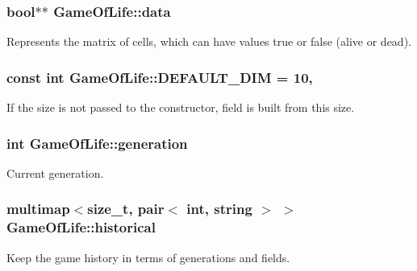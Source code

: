 \subsubsection[{data}]{\setlength{\rightskip}{0pt plus 5cm}bool$\ast$$\ast$ Game\+Of\+Life\+::data\hspace{0.3cm}{\ttfamily [private]}}\hypertarget{classGameOfLife_a6e0a1d177ae3dd8c687ed766e57b3d36}{}\label{classGameOfLife_a6e0a1d177ae3dd8c687ed766e57b3d36}
Represents the matrix of cells, which can have values true or false (alive or dead). 
\subsubsection[{D\+E\+F\+A\+U\+L\+T\+\_\+\+D\+IM}]{\setlength{\rightskip}{0pt plus 5cm}const int Game\+Of\+Life\+::\+D\+E\+F\+A\+U\+L\+T\+\_\+\+D\+IM = 10\hspace{0.3cm}{\ttfamily [static]}, {\ttfamily [private]}}\hypertarget{classGameOfLife_a15976a2df224994b6fa2ca57242fd093}{}\label{classGameOfLife_a15976a2df224994b6fa2ca57242fd093}
If the size is not passed to the constructor, field is built from this size. 
\subsubsection[{generation}]{\setlength{\rightskip}{0pt plus 5cm}int Game\+Of\+Life\+::generation\hspace{0.3cm}{\ttfamily [private]}}\hypertarget{classGameOfLife_aab1dc4078fe46596650d64ad50313555}{}\label{classGameOfLife_aab1dc4078fe46596650d64ad50313555}
Current generation. 
\subsubsection[{historical}]{\setlength{\rightskip}{0pt plus 5cm}multimap$<$size\+\_\+t, pair$<$ int, string $>$ $>$ Game\+Of\+Life\+::historical\hspace{0.3cm}{\ttfamily [private]}}\hypertarget{classGameOfLife_a3288a6c2face420e667f9ca31c302e00}{}\label{classGameOfLife_a3288a6c2face420e667f9ca31c302e00}
Keep the game history in terms of generations and fields. 
